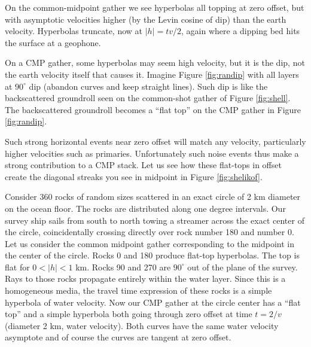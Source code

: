 \par
On the common-midpoint gather we see 
hyperbolas all topping at zero offset,
but with asymptotic velocities
higher (by the Levin cosine of dip)
than the earth velocity.
Hyperbolas truncate, now at $|h| = tv/2 $,
again where a dipping bed hits the surface at a geophone.


\par
On a CMP gather, some hyperbolas may seem high velocity,
but it is the dip, not the earth velocity itself that causes it.
Imagine Figure \ref{fig:randip} with all layers at $90^\circ$ dip
(abandon curves and keep straight lines).
Such dip is like the backscattered groundroll
seen on the common-shot gather of Figure \ref{fig:shell}.
The backscattered groundroll
becomes a ``flat top'' on
the CMP gather in Figure \ref{fig:randip}.

\par
Such strong horizontal events near zero offset
will match any velocity,
particularly higher velocities such as primaries.
Unfortunately such noise events
thus make a strong contribution to a CMP stack.
Let us see how these flat-tops in offset create
the diagonal streaks you see in midpoint in Figure \ref{fig:shelikof}.
\newslide

\par
Consider 360 rocks of random sizes scattered in an exact
circle of 2 km diameter on the ocean floor.
The rocks are distributed along one degree intervals.
Our survey ship sails from south to north
towing a streamer across the exact center of the circle,
coincidentally crossing directly over rock number 180 and number 0.
Let us consider the common midpoint gather corresponding
to the midpoint in the center of the circle.
Rocks 0 and 180 produce flat-top hyperbolas.
The top is flat for $0<|h|<1$ km.
Rocks 90 and 270 are $90^\circ$ out of the plane of the survey.
Rays to those rocks propagate entirely within the water layer.
Since this is a homogeneous media,
the travel time expression of these rocks
is a simple hyperbola of water velocity.
Now our CMP gather at the circle center has
a ``flat top'' and a simple hyperbola
both going through zero offset at time $t=2/v$ (diameter 2 km, water velocity).
Both curves have the same water velocity asymptote
and of course the curves are tangent at zero offset.

